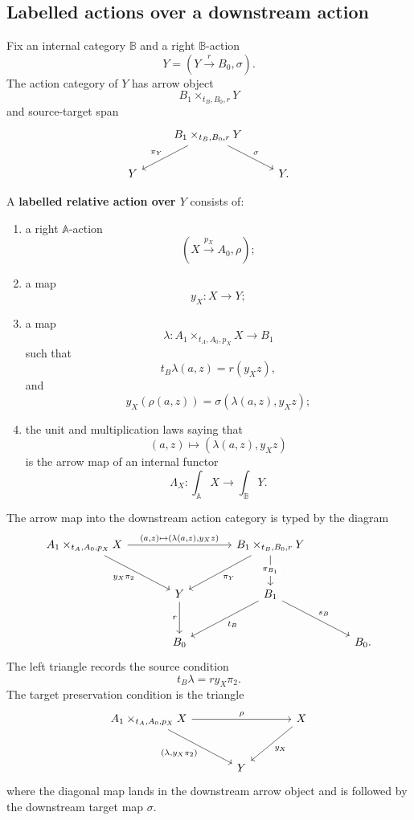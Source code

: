 \subsection{Labelled actions over a downstream action}
\label{subsec:poly-relative-labelled-actions-definition}

Fix an internal category \(\mathbb B\) and a right \(\mathbb B\)-action
\[
Y=(Y\xrightarrow{r}B_0,\sigma).
\]
The action category of \(Y\) has arrow object
\[
B_1\times_{t_B,B_0,r}Y
\]
and source-target span
\[
\begin{tikzcd}
&
B_1\times_{t_B,B_0,r}Y
  \arrow[dl,"\pi_Y"']
  \arrow[dr,"\sigma"]
&
\\
Y && Y .
\end{tikzcd}
\]

\begin{definition}
\label{def:poly-relative-labelled-action}
A \textbf{labelled relative action over \(Y\)} consists of:
\begin{enumerate}
\item a right \(\mathbb A\)-action
\[
(X\xrightarrow{p_X}A_0,\rho);
\]
\item a map
\[
y_X:X\to Y;
\]
\item a map
\[
\lambda:
A_1\times_{t_A,A_0,p_X}X\to B_1
\]
such that
\[
t_B\lambda(a,z)=r(y_Xz),
\]
and
\[
y_X(\rho(a,z))
=
\sigma(\lambda(a,z),y_Xz);
\]
\item the unit and multiplication laws saying that
\[
(a,z)\longmapsto(\lambda(a,z),y_Xz)
\]
is the arrow map of an internal functor
\[
\Lambda_X:\int_{\mathbb A}X\to\int_{\mathbb B}Y.
\]
\end{enumerate}
\end{definition}

The arrow map into the downstream action category is typed by the diagram
\[
\begin{tikzcd}[column sep=large,row sep=large]
A_1\times_{t_A,A_0,p_X}X
  \arrow[rr,"{(a,z)\mapsto(\lambda(a,z),y_Xz)}"]
  \arrow[dr,"y_X\pi_2"']
&&
B_1\times_{t_B,B_0,r}Y
  \arrow[dl,"\pi_Y"]
  \arrow[d,"\pi_{B_1}" description]
\\
&
Y
  \arrow[d,"r"']
&
B_1
  \arrow[dl,"t_B"]
  \arrow[dr,"s_B"]
\\
&
B_0
&&
B_0 .
\end{tikzcd}
\]
The left triangle records the source condition
\[
t_B\lambda=r y_X\pi_2.
\]
The target preservation condition is the triangle
\[
\begin{tikzcd}[column sep=large,row sep=large]
A_1\times_{t_A,A_0,p_X}X
  \arrow[rr,"\rho"]
  \arrow[dr,"{(\lambda,y_X\pi_2)}"']
&&
X
  \arrow[dl,"y_X"]
\\
&
Y
&
\end{tikzcd}
\]
where the diagonal map lands in the downstream arrow object and is followed by
the downstream target map \(\sigma\).

